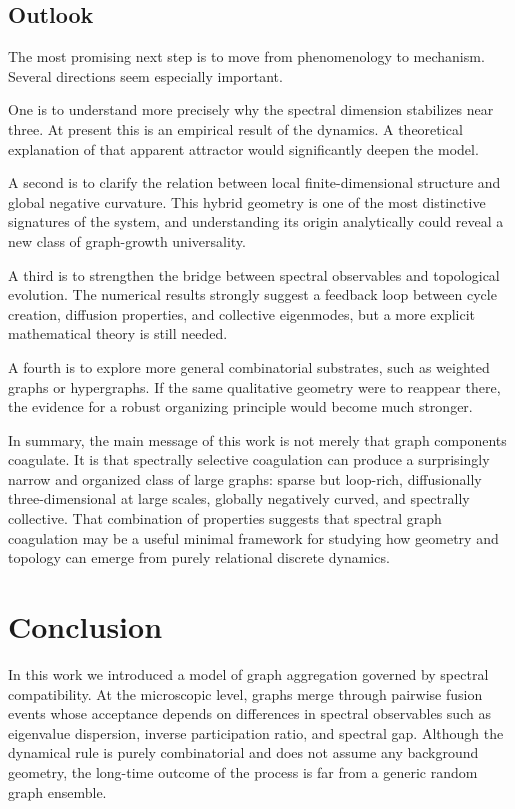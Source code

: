 \documentclass[11pt]{article}
\begin{document}
\subsection{Outlook}

The most promising next step is to move from phenomenology to mechanism.
Several directions seem especially important.

One is to understand more precisely why the spectral dimension stabilizes near three.
At present this is an empirical result of the dynamics.
A theoretical explanation of that apparent attractor would significantly deepen the model.

A second is to clarify the relation between local finite-dimensional structure and global negative curvature.
This hybrid geometry is one of the most distinctive signatures of the system, and understanding its origin analytically could reveal a new class of graph-growth universality.

A third is to strengthen the bridge between spectral observables and topological evolution.
The numerical results strongly suggest a feedback loop between cycle creation, diffusion properties, and collective eigenmodes, but a more explicit mathematical theory is still needed.

A fourth is to explore more general combinatorial substrates, such as weighted graphs or hypergraphs.
If the same qualitative geometry were to reappear there, the evidence for a robust organizing principle would become much stronger.

In summary, the main message of this work is not merely that graph components coagulate.
It is that spectrally selective coagulation can produce a surprisingly narrow and organized class of large graphs:
sparse but loop-rich, diffusionally three-dimensional at large scales, globally negatively curved, and spectrally collective.
That combination of properties suggests that spectral graph coagulation may be a useful minimal framework for studying how geometry and topology can emerge from purely relational discrete dynamics.
\section{Conclusion}
\label{sec:conclusion}

In this work we introduced a model of graph aggregation governed by spectral compatibility.
At the microscopic level, graphs merge through pairwise fusion events whose acceptance depends on differences in spectral observables such as eigenvalue dispersion, inverse participation ratio, and spectral gap.
Although the dynamical rule is purely combinatorial and does not assume any background geometry, the long-time outcome of the process is far from a generic random graph ensemble.
\end{document}
